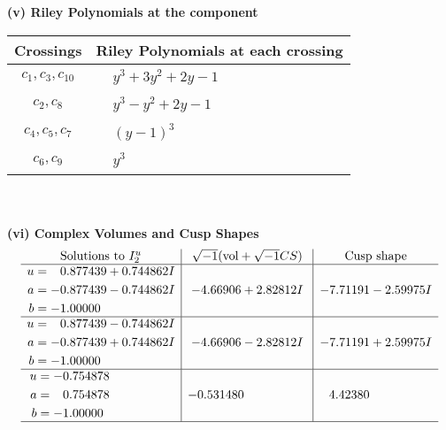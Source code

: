 \documentclass[1p]{elsarticle_modified}
\theoremstyle{definition}
\newcommand{\I}{\sqrt{-1}}
\begin{document}
\flushleft \textbf{(v) Riley Polynomials at the component}\newline \\
\begin{tabular}{m{50pt}|m{274pt}}
Crossings & \hspace{64pt}Riley Polynomials at each crossing \\
\hline $$\begin{aligned}c_{1},c_{3},c_{10}\end{aligned}$$&$\begin{aligned}
&y^3+3 y^2+2 y-1
\end{aligned}$\\
\hline $$\begin{aligned}c_{2},c_{8}\end{aligned}$$&$\begin{aligned}
&y^3- y^2+2 y-1
\end{aligned}$\\
\hline $$\begin{aligned}c_{4},c_{5},c_{7}\end{aligned}$$&$\begin{aligned}
&(y-1)^3
\end{aligned}$\\
\hline $$\begin{aligned}c_{6},c_{9}\end{aligned}$$&$\begin{aligned}
&y^3
\end{aligned}$\\
\hline
\end{tabular}\\~\\
\newpage\flushleft \textbf{(vi) Complex Volumes and Cusp Shapes}
$$\begin{array}{c|c|c}  
\text{Solutions to }I^u_{2}& \I (\text{vol} + \sqrt{-1}CS) & \text{Cusp shape}\\
 \hline 
\begin{aligned}
u &= \phantom{-}0.877439 + 0.744862 I \\
a &= -0.877439 - 0.744862 I \\
b &= -1.00000\phantom{ +0.000000I}\end{aligned}
 & -4.66906 + 2.82812 I & -7.71191 - 2.59975 I \\ \hline\begin{aligned}
u &= \phantom{-}0.877439 - 0.744862 I \\
a &= -0.877439 + 0.744862 I \\
b &= -1.00000\phantom{ +0.000000I}\end{aligned}
 & -4.66906 - 2.82812 I & -7.71191 + 2.59975 I \\ \hline\begin{aligned}
u &= -0.754878\phantom{ +0.000000I} \\
a &= \phantom{-}0.754878\phantom{ +0.000000I} \\
b &= -1.00000\phantom{ +0.000000I}\end{aligned}
 & -0.531480\phantom{ +0.000000I} & \phantom{-}4.42380\phantom{ +0.000000I}\\
 \hline 
 \end{array}$$\newpage
\end{document}
